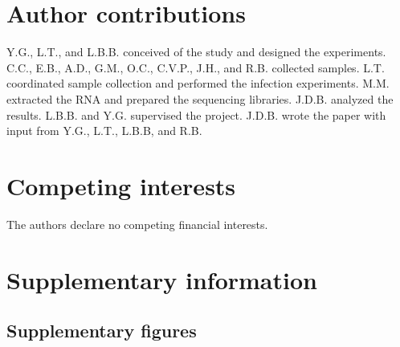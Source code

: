 \documentclass[fleqn,10pt]{wlscirep}
\newcommand{\beginsupplement}{%
 \setcounter{table}{0}
 \renewcommand{\thetable}{S\arabic{table}}%
 \setcounter{figure}{0}
 \renewcommand{\thefigure}{S\arabic{figure}}%
 }
\begin{document}
\section*{Author contributions}

Y.G., L.T., and L.B.B. conceived of the study and designed the
experiments. C.C., E.B., A.D., G.M., O.C., C.V.P., J.H., and R.B.
collected samples. L.T. coordinated sample collection and performed
the infection experiments. M.M. extracted the RNA and prepared the
sequencing libraries. J.D.B. analyzed the results. L.B.B. and Y.G.
supervised the project. J.D.B. wrote the paper with input from Y.G.,
L.T., L.B.B, and R.B.
\section*{Competing interests}

The authors declare no competing financial interests.



\clearpage\newpage
\beginsupplement
\section*{Supplementary information}

\subsection*{Supplementary figures}
\end{document}
